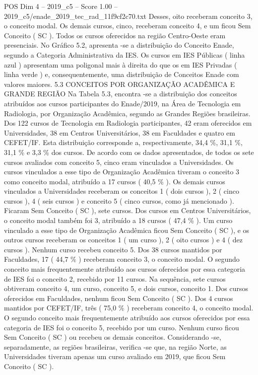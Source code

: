 \begin{textsample}{POS Dim 4 – 2019\_c5 – Score 1.00 – 2019\_c5/enade\_2019\_tec\_rad\_11f9cf2c70.txt}
Desses, oito receberam conceito 3, o conceito modal.
Os demais cursos, cinco, receberam conceito 4, e um ficou Sem Conceito ( SC ).
Todos os cursos oferecidos na região Centro-Oeste eram presenciais.
No Gráfico 5.2, apresenta -se a distribuição do Conceito Enade, segundo a Categoria Administrativa da IES.
Os cursos em IES Públicas ( linha azul ) apresentam uma poligonal mais à direita do que os em IES Privadas ( linha verde ) e, consequentemente, uma distribuição de Conceitos Enade com valores maiores. 5.3 CONCEITOS POR ORGANIZAÇÃO ACADÊMICA E GRANDE REGIÃO Na Tabela 5.3, encontra -se a distribuição dos conceitos atribuídos aos cursos participantes do Enade/2019, na Área de Tecnologia em Radiologia, por Organização Acadêmica, segundo as Grandes Regiões brasileiras.
Dos 122 cursos de Tecnologia em Radiologia participantes, 42 eram oferecidos em Universidades, 38 em Centros Universitários, 38 em Faculdades e quatro em CEFET/IF.
Esta distribuição corresponde a, respectivamente, 34,4 \%, 31,1 \%, 31,1 \% e 3,3 \% dos cursos.
De acordo com os dados apresentados, de todos os sete cursos avaliados com conceito 5, cinco eram vinculados a Universidades.
Os cursos vinculados a esse tipo de Organização Acadêmica tiveram o conceito 3 como conceito modal, atribuído a 17 cursos ( 40,5 \% ).
Os demais cursos vinculados a Universidades receberam os conceitos 1 ( dois cursos ), 2 ( cinco cursos ), 4 ( seis cursos ) e conceito 5 ( cinco cursos, como já mencionado ).
Ficaram Sem Conceito ( SC ), sete cursos.
Dos cursos em Centros Universitários, o conceito modal também foi 3, atribuído a 18 cursos ( 47,4 \% ).
Um curso vinculado a esse tipo de Organização Acadêmica ficou Sem Conceito ( SC ), e os outros cursos receberam os conceitos 1 ( um curso ), 2 ( oito cursos ) e 4 ( dez cursos ).
Nenhum curso recebeu conceito 5.
Dos 38 cursos mantidos por Faculdades, 17 ( 44,7 \% ) receberam conceito 3, o conceito modal.
O segundo conceito mais frequentemente atribuído aos cursos oferecidos por essa categoria de IES foi o conceito 2, recebido por 11 cursos.
Na sequência, sete cursos obtiveram conceito 4, um curso, conceito 5, e dois cursos, conceito 1.
Dos cursos oferecidos em Faculdades, nenhum ficou Sem Conceito ( SC ).
Dos 4 cursos mantidos por CEFET/IF, três ( 75,0 \% ) receberam conceito 4, o conceito modal.
O segundo conceito mais frequentemente atribuído aos cursos oferecidos por essa categoria de IES foi o conceito 5, recebido por um curso.
Nenhum curso ficou Sem Conceito ( SC ) ou recebeu os demais conceitos.
Considerando -se, separadamente, as regiões brasileiras, verifica -se que, na região Norte, as Universidades tiveram apenas um curso avaliado em 2019, que ficou Sem Conceito ( SC ).

\end{textsample}
